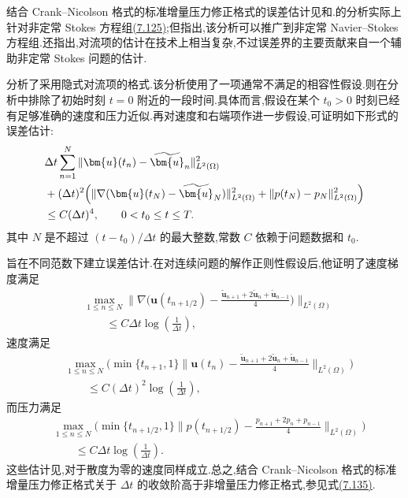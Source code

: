 \begin{note}\label{note:incremental-pressure-correction-cn-error}
结合 Crank--Nicolson 格式的标准增量压力修正格式的误差估计见\textcite{Shen1992b,Shen1996}和\textcite[Chapter~7]{Prohl1997}.\textcite{Prohl1997}的分析实际上针对非定常 Stokes 方程组\hyperref[eq:transient-stokes-stabilization]{(7.125)};但\textcite[Remark~7.1]{Prohl1997}指出,该分析可以推广到非定常 Navier--Stokes 方程组.\textcite{Shen1996}还指出,对流项的估计在技术上相当复杂,不过误差界的主要贡献来自一个辅助非定常 Stokes 问题的估计.

\textcite{Shen1992b}分析了采用隐式对流项的格式.该分析使用了一项通常不满足的相容性假设.\textcite{Shen1996}则在分析中排除了初始时刻 $t=0$ 附近的一段时间.具体而言,假设在某个 $t_0>0$ 时刻已经有足够准确的速度和压力近似.再对速度和右端项作进一步假设,可证明如下形式的误差估计:
\[
\begin{aligned}
 &\Delta t\sum_{n=1}^{N}
   \|\bm{u}(t_n)-\widetilde{\bm{u}}_n\|_{L^2(\Omega)}^2\\
 &+(\Delta t)^2\Bigl(
   \|\nabla(\bm{u}(t_N)-\widetilde{\bm{u}}_N)\|_{L^2(\Omega)}^2
   +\|p(t_N)-p_N\|_{L^2(\Omega)}^2\Bigr)\\
 &\le C(\Delta t)^4,
   \qquad 0<t_0\le t\le T.
\end{aligned}
\]
其中 $N$ 是不超过 $(t-t_0)/\Delta t$ 的最大整数,常数 $C$ 依赖于问题数据和 $t_0$.

\textcite{Prohl1997}旨在不同范数下建立误差估计.在对连续问题的解作正则性假设后,他证明了速度梯度满足
\[
\begin{aligned}
&\max_{1\le n\le N}
 \Biggl\|\nabla\Biggl(\bm{u}(t_{n+1/2})
 -\frac{\widetilde{\bm{u}}_{n+1}
        +2\widetilde{\bm{u}}_n
        +\widetilde{\bm{u}}_{n-1}}{4}\Biggr)\Biggr\|_{L^2(\Omega)}\\
&\qquad\le C\Delta t\log\!\left(\frac{1}{\Delta t}\right),
\end{aligned}
\]
速度满足
\[
\begin{aligned}
&\max_{1\le n\le N}\Biggl(
  \min\{t_{n+1},1\}
  \Biggl\|\bm{u}(t_n)-\frac{\widetilde{\bm{u}}_{n+1}
        +2\widetilde{\bm{u}}_n
        +\widetilde{\bm{u}}_{n-1}}{4}\Biggr\|_{L^2(\Omega)}\Biggr)\\
&\qquad\le C(\Delta t)^2
  \log\!\left(\frac{1}{\Delta t}\right),
\end{aligned}
\]
而压力满足
\[
\begin{aligned}
&\max_{1\le n\le N}\Biggl(
  \min\{t_{n+1/2},1\}
  \Biggl\|p(t_{n+1/2})
  -\frac{p_{n+1}+2p_n+p_{n-1}}{4}\Biggr\|_{L^2(\Omega)}\Biggr)\\
&\qquad\le C\Delta t\log\!\left(\frac{1}{\Delta t}\right).
\end{aligned}
\]
这些估计见\textcite[Theorem~7.1]{Prohl1997},对于散度为零的速度同样成立.总之,结合 Crank--Nicolson 格式的标准增量压力修正格式关于 $\Delta t$ 的收敛阶高于非增量压力修正格式,参见式\hyperref[eq:nonincremental-pressure-correction-errors]{(7.135)}.
\end{note}

